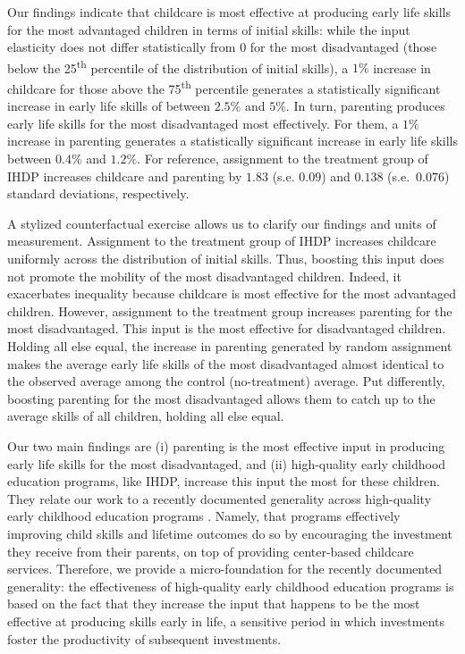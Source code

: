 Our findings indicate that childcare is most effective at producing early life skills for the most advantaged children in terms of initial skills: while the input elasticity does not differ statistically from $0$ for the most disadvantaged (those below the 25\textsuperscript{th} percentile of the distribution of initial skills), a $1\%$ increase in childcare for those above the 75\textsuperscript{th} percentile generates a statistically significant increase in early life skills of between $2.5\%$ and $5\%$. In turn, parenting produces early life skills for the most disadvantaged most effectively. For them, a $1\%$ increase in parenting generates a statistically significant increase in early life skills between $0.4\%$ and $1.2\%$. For reference, assignment to the treatment group of IHDP increases childcare and parenting by $1.83$ (s.e. $0.09$) and $0.138$ (s.e.\ $0.076$) standard deviations, respectively. 

A stylized counterfactual exercise allows us to clarify our findings and units of measurement. Assignment to the treatment group of IHDP increases childcare uniformly across the distribution of initial skills. Thus, boosting this input does not promote the mobility of the most disadvantaged children. Indeed, it exacerbates inequality because childcare is most effective for the most advantaged children. However, assignment to the treatment group increases parenting for the most disadvantaged. This input is the most effective for disadvantaged children. Holding all else equal, the increase in parenting generated by random assignment makes the average early life skills of the most disadvantaged almost identical to the observed average among the control (no-treatment) average. Put differently, boosting parenting for the most disadvantaged allows them to catch up to the average skills of all children, holding all else equal. 

Our two main findings are (i) parenting is the most effective input in producing early life skills for the most disadvantaged, and (ii) high-quality early childhood education programs, like IHDP, increase this input the most for these children. They relate our work to a recently documented generality across high-quality early childhood education programs \citep{garciaParentingPromotesSocial2023}. Namely, that programs effectively improving child skills and lifetime outcomes do so by encouraging the investment they receive from their parents, on top of providing center-based childcare services. Therefore, we provide a micro-foundation for the recently documented generality: the effectiveness of high-quality early childhood education programs is based on the fact that they increase the input that happens to be the most effective at producing skills early in life, a sensitive period in which investments foster the productivity of subsequent investments. 


